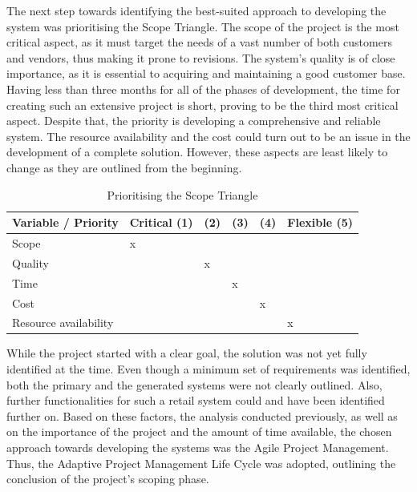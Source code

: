 The next step towards identifying the best-suited approach to developing the system was prioritising the Scope Triangle. The scope of the project is the most critical aspect, as it must target the needs of a vast number of both customers and vendors, thus making it prone to revisions. The system's quality is of close importance, as it is essential to acquiring and maintaining a good customer base. Having less than three months for all of the phases of development, the time for creating such an extensive project is short, proving to be the third most critical aspect. Despite that, the priority is developing a comprehensive and reliable system. The resource availability and the cost could turn out to be an issue in the development of a complete solution. However, these aspects are least likely to change as they are outlined from the beginning.\\

\begin{table}[t]
\centering
    \begin{tabular}{ | l | p{1.2cm} | p{1.2cm} | p{1.2cm} | p{1.2cm} | p{1.2cm} |}
    \hline
    Variable / Priority & Critical (1) & (2) & (3) & (4) & Flexible (5) \\ \hline
    Scope & x &  &  &  &  \\ \hline
    Quality &  & x &  &  &  \\ \hline
    Time &  &  & x &  &  \\ \hline
    Cost &  &  &  & x &  \\ \hline
    Resource availability &  &  &  &  & x \\
    \hline
    \end{tabular}
 \caption{Prioritising the Scope Triangle}
\label{tab:scope_triangle}
\end{table}

While the project started with a clear goal, the solution was not yet fully identified at the time. Even though a minimum set of requirements was identified, both the primary and the generated systems were not clearly outlined. Also, further functionalities for such a retail system could and have been identified further on. Based on these factors, the analysis conducted previously, as well as on the importance of the project and the amount of time available, the chosen approach towards developing the systems was the Agile Project Management. Thus, the Adaptive Project Management Life Cycle was adopted, outlining the conclusion of the project's scoping phase. 

